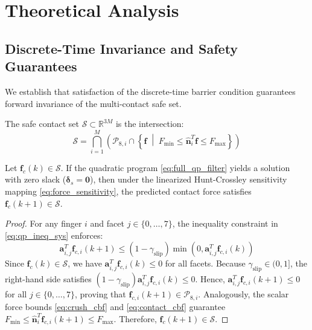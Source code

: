 \section{Theoretical Analysis}
\label{sec:theoretical_analysis}

\subsection{Discrete-Time Invariance and Safety Guarantees}
We establish that satisfaction of the discrete-time barrier condition guarantees forward invariance of the multi-contact safe set.

\begin{definition}
The safe contact set $\mathcal{S} \subset \mathbb{R}^{3M}$ is the intersection:
\begin{equation}
    \mathcal{S} = \bigcap_{i=1}^M \left( \mathcal{P}_{8, i} \cap \left\{ \mathbf{f} \;\middle|\; F_{\min} \le \hat{\mathbf{n}}_i^T \mathbf{f} \le F_{\max} \right\} \right)
\end{equation}
\end{definition}

\begin{theorem}
\label{thm:invariance}
Let $\mathbf{f}_{c}(k) \in \mathcal{S}$. If the quadratic program \eqref{eq:full_qp_filter} yields a solution with zero slack ($\boldsymbol{\delta}_s = \mathbf{0}$), then under the linearized Hunt-Crossley sensitivity mapping \eqref{eq:force_sensitivity}, the predicted contact force satisfies $\mathbf{f}_c(k+1) \in \mathcal{S}$.
\end{theorem}
\begin{proof}
For any finger $i$ and facet $j \in \{0, \dots, 7\}$, the inequality constraint in \eqref{eq:qp_ineq_sys} enforces:
\begin{equation}
    \mathbf{a}_{i, j}^T \mathbf{f}_{c, i}(k+1) \le (1 - \gamma_{\text{slip}}) \min\left(0, \mathbf{a}_{i, j}^T \mathbf{f}_{c, i}(k)\right)
\end{equation}
Since $\mathbf{f}_c(k) \in \mathcal{S}$, we have $\mathbf{a}_{i, j}^T \mathbf{f}_{c, i}(k) \le 0$ for all facets. Because $\gamma_{\text{slip}} \in (0, 1]$, the right-hand side satisfies $(1 - \gamma_{\text{slip}}) \mathbf{a}_{i, j}^T \mathbf{f}_{c, i}(k) \le 0$. Hence, $\mathbf{a}_{i, j}^T \mathbf{f}_{c, i}(k+1) \le 0$ for all $j \in \{0, \dots, 7\}$, proving that $\mathbf{f}_{c, i}(k+1) \in \mathcal{P}_{8, i}$. Analogously, the scalar force bounds \eqref{eq:crush_cbf} and \eqref{eq:contact_cbf} guarantee $F_{\min} \le \hat{\mathbf{n}}_i^T \mathbf{f}_{c, i}(k+1) \le F_{\max}$. Therefore, $\mathbf{f}_c(k+1) \in \mathcal{S}$.
\end{proof}

